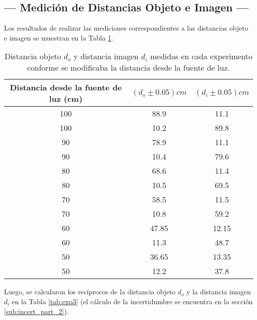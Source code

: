 \documentclass[10pt,a4paper]{article}
\begin{document}
\subsection{--- Medición de Distancias Objeto e Imagen ---} %
\label{sub:parte_2}
Los resultados de realizar las mediciones correspondientes a las distancias objeto e imagen se muestran en la Tabla \ref{tab:exp2}.
\begin{table}[ht]
	\small 
\centering
\caption{\small Distancia objeto $d_o$ y distancia imagen $d_i$ medidas en cada experimento conforme se modificaba la distancia desde la fuente de luz.}	
\begin{tabular}{|c|c|c|}
	\hline
	Distancia desde la fuente de luz (cm) & $ (d_o \pm 0.05) cm$ & $(d_i \pm 0.05)cm$ \\
	\hline
	100 & 88.9 & 11.1 \\ 	\hline
	100 & 10.2 & 89.8 \\ 	\hline
	90 & 78.9 & 11.1 \\ 	\hline
	90 & 10.4 & 79.6 \\ 	\hline
	80 & 68.6 & 11.4 \\ 	\hline
	80 & 10.5 & 69.5 \\ 	\hline
	70 & 58.5 & 11.5 \\ 	\hline
	70 & 10.8 & 59.2 \\ 	\hline
	60 & 47.85 & 12.15 \\ 	\hline
	60 & 11.3 & 48.7 \\ 	\hline
	50 & 36.65 & 13.35 \\ 	\hline
	50 & 12.2 & 37.8 \\ 	\hline
\end{tabular}
\label{tab:exp2}
\end{table}
\newpage
Luego, se calcularon los recíprocos de la distancia objeto $d_o$ y la distancia imagen $d_i$ en la Tabla \ref{tab:exp3} (el cálculo de la incertidumbre se encuentra en la sección \ref{sub:incert_part_2}).
\end{document}
